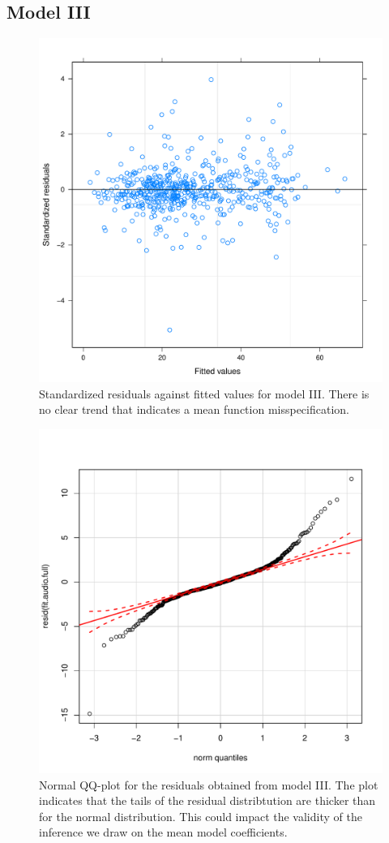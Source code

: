 \documentclass[paper=a4, fontsize=11pt]{scrartcl} %
\numberwithin{equation}{section} %
\numberwithin{figure}{section} %
\numberwithin{table}{section} %
\begin{document}
\subsection{Model III}
\label{sec:model_ii_app}

\captionsetup{width=.9\textwidth}
\begin{figure}[H]
\centering
\includegraphics[width=.5\textwidth]{./rcode/plots/model_iii_resid}
\caption{Standardized residuals against fitted values for model III. There is no clear trend that indicates a mean function misspecification.}
\label{fig:model_ii_pearson}
\end{figure}
\begin{figure}[H]
\centering
\includegraphics[width=.5\textwidth]{./rcode/plots/model_iii_qq}
\caption{Normal QQ-plot for the residuals obtained from model III. The plot indicates that the tails of the residual distribtution are thicker than for the normal distribution. This could impact the validity of the inference we draw on the mean model coefficients.}
\label{fig:model_ii_diagnostics}
\end{figure}
\end{document}
